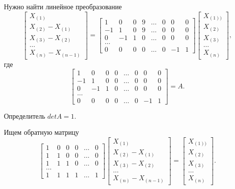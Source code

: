 Нужно найти линейное преобразование
$$\begin{bmatrix}
    X_{ \left( 1 \right) } \\
    X_{ \left( 2 \right) } - X_{ \left( 1 \right) } \\
    X_{ \left( 3 \right) } - X_{ \left( 2 \right) } \\
    \dotsc \\
    X_{ \left( n \right) } - X_{ \left( n - 1 \right) }
  \end{bmatrix} =
  \begin{bmatrix}
    1 & 0 & 0 & 9 & \dots & 0 & 0 & 0\\
    -1 & 1 & 0 & 9 & \dots & 0 & 0 & 0\\
    0 & -1 & 1 & 0 & \dotsc & 0 & 0 & 0\\
    \dotsc \\
    0 & 0 & 0 & 0 & \dotsc & 0 & -1 & 1
  \end{bmatrix}
  \begin{bmatrix}
    X_{ \left( 1 \right) )} \\
    X_{ \left( 2 \right) } \\
    X_{ \left( 3 \right) } \\
    \dotsc \\
    X_{ \left( n \right) }
  \end{bmatrix},$$
где
$$\begin{bmatrix}
    1 & 0 & 0 & 0 & \dots & 0 & 0 & 0\\
    -1 & 1 & 0 & 0 & \dots & 0 & 0 & 0\\
    0 & -1 & 1 & 0 & \dotsc & 0 & 0 & 0\\
    \dotsc \\
    0 & 0 & 0 & 0 & \dotsc & 0 & -1 & 1
  \end{bmatrix} =
  A.$$

Определитель $detA = 1$.

Ищем обратную матрицу
$$\begin{bmatrix}
    1 & 0 & 0 & 0 & \dots & 0 \\
    1 & 1 & 0 & 0 & \dots & 0 \\
    1 & 1 & 1 & 0 & \dotsc & 0 \\
    \dotsc \\
    1 & 1 & 1 & 1 & \dotsc & 1
  \end{bmatrix}
  \begin{bmatrix}
    X_{ \left( 1 \right) } \\
    X_{ \left( 2 \right) } - X_{ \left( 1 \right) } \\
    X_{ \left( 3 \right) } - X_{ \left( 2 \right) } \\
    \dotsc \\
    X_{ \left( n \right) } - X_{ \left( n - 1 \right) }
  \end{bmatrix} =
  \begin{bmatrix}
    X_{ \left( 1 \right) )} \\
    X_{ \left( 2 \right) } \\
    X_{ \left( 3 \right) } \\
    \dotsc \\
    X_{ \left( n \right) }
  \end{bmatrix}.$$

